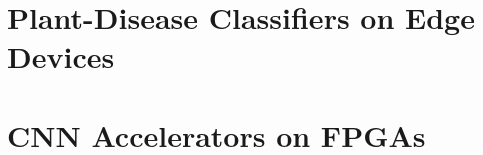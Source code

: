 \section{Plant-Disease Classifiers on Edge Devices}
\label{sec:related-edge}

\section{CNN Accelerators on FPGAs}
\label{sec:related-accel}

